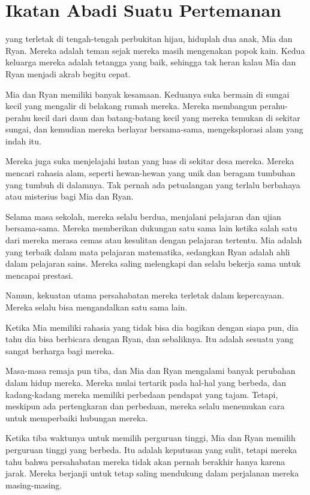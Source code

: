 \chapter*{Ikatan Abadi Suatu Pertemanan}

 yang terletak di tengah-tengah perbukitan hijau, hiduplah dua anak, Mia dan Ryan. Mereka adalah teman sejak mereka masih mengenakan popok kain. Kedua keluarga mereka adalah tetangga yang baik, sehingga tak heran kalau Mia dan Ryan menjadi akrab begitu cepat.


Mia dan Ryan memiliki banyak kesamaan. Keduanya suka bermain di sungai kecil yang mengalir di belakang rumah mereka. Mereka membangun perahu-perahu kecil dari daun dan batang-batang kecil yang mereka temukan di sekitar sungai, dan kemudian mereka berlayar bersama-sama, mengeksplorasi alam yang indah itu.


Mereka juga suka menjelajahi hutan yang luas di sekitar desa mereka. Mereka mencari rahasia alam, seperti hewan-hewan yang unik dan beragam tumbuhan yang tumbuh di dalamnya. Tak pernah ada petualangan yang terlalu berbahaya atau misterius bagi Mia dan Ryan.


Selama masa sekolah, mereka selalu berdua, menjalani pelajaran dan ujian bersama-sama. Mereka memberikan dukungan satu sama lain ketika salah satu dari mereka merasa cemas atau kesulitan dengan pelajaran tertentu. Mia adalah yang terbaik dalam mata pelajaran matematika, sedangkan Ryan adalah ahli dalam pelajaran sains. Mereka saling melengkapi dan selalu bekerja sama untuk mencapai prestasi.


Namun, kekuatan utama persahabatan mereka terletak dalam kepercayaan. Mereka selalu bisa mengandalkan satu sama lain.


Ketika Mia memiliki rahasia yang tidak bisa dia bagikan dengan siapa pun, dia tahu dia bisa berbicara dengan Ryan, dan sebaliknya. Itu adalah sesuatu yang sangat berharga bagi mereka.


Masa-masa remaja pun tiba, dan Mia dan Ryan mengalami banyak perubahan dalam hidup mereka. Mereka mulai tertarik pada hal-hal yang berbeda, dan kadang-kadang mereka memiliki perbedaan pendapat yang tajam. Tetapi, meskipun ada pertengkaran dan perbedaan, mereka selalu menemukan cara untuk memperbaiki hubungan mereka.


Ketika tiba waktunya untuk memilih perguruan tinggi, Mia dan Ryan memilih perguruan tinggi yang berbeda. Itu adalah keputusan yang sulit, tetapi mereka tahu bahwa persahabatan mereka tidak akan pernah berakhir hanya karena jarak. Mereka berjanji untuk tetap saling mendukung dalam perjalanan mereka masing-masing.


